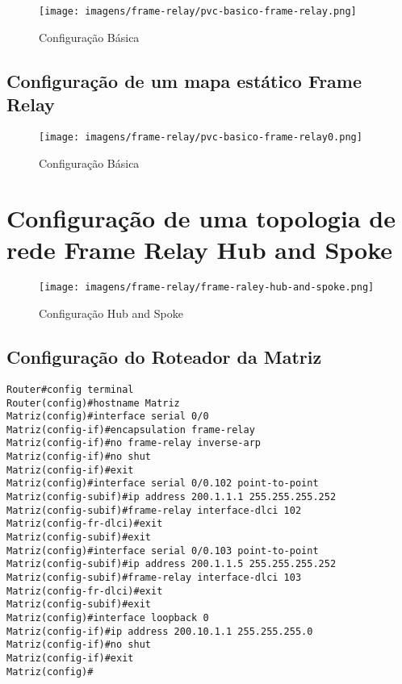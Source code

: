 \documentclass[]{article}
\begin{document}
\begin{figure}
\centering
\texttt{[image: imagens/frame-relay/pvc-basico-frame-relay.png]}
\caption{Configuração Básica}
\end{figure}

\hypertarget{configurauxe7uxe3o-de-um-mapa-estuxe1tico-frame-relay}{%
\subsection{Configuração de um mapa estático Frame
Relay}\label{configurauxe7uxe3o-de-um-mapa-estuxe1tico-frame-relay}}

\begin{figure}
\centering
\texttt{[image: imagens/frame-relay/pvc-basico-frame-relay0.png]}
\caption{Configuração Básica}
\end{figure}

\hypertarget{configurauxe7uxe3o-de-uma-topologia-de-rede-frame-relay-hub-and-spoke}{%
\section{Configuração de uma topologia de rede Frame Relay Hub and
Spoke}\label{configurauxe7uxe3o-de-uma-topologia-de-rede-frame-relay-hub-and-spoke}}

\begin{figure}
\centering
\texttt{[image: imagens/frame-relay/frame-raley-hub-and-spoke.png]}
\caption{Configuração Hub and Spoke}
\end{figure}

\hypertarget{configurauxe7uxe3o-do-roteador-da-matriz}{%
\subsection{Configuração do Roteador da
Matriz}\label{configurauxe7uxe3o-do-roteador-da-matriz}}

\begin{verbatim}
Router#config terminal
Router(config)#hostname Matriz
Matriz(config)#interface serial 0/0
Matriz(config-if)#encapsulation frame-relay
Matriz(config-if)#no frame-relay inverse-arp
Matriz(config-if)#no shut
Matriz(config-if)#exit
Matriz(config)#interface serial 0/0.102 point-to-point
Matriz(config-subif)#ip address 200.1.1.1 255.255.255.252
Matriz(config-subif)#frame-relay interface-dlci 102
Matriz(config-fr-dlci)#exit
Matriz(config-subif)#exit
Matriz(config)#interface serial 0/0.103 point-to-point
Matriz(config-subif)#ip address 200.1.1.5 255.255.255.252
Matriz(config-subif)#frame-relay interface-dlci 103
Matriz(config-fr-dlci)#exit
Matriz(config-subif)#exit
Matriz(config)#interface loopback 0
Matriz(config-if)#ip address 200.10.1.1 255.255.255.0
Matriz(config-if)#no shut
Matriz(config-if)#exit
Matriz(config)#
\end{verbatim}
\end{document}
